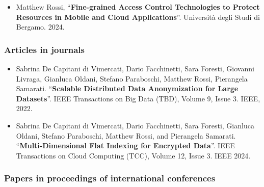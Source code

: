 \begin{itemize}
    \nocite{thesis}
    \item Matthew Rossi, ``\textbf{Fine-grained Access Control
        Technologies to Protect Resources in Mobile and Cloud
        Applications}''. Università degli Studi di Bergamo. 2024.
\end{itemize}

\subsubsection*{Articles in journals}

\begin{itemize}
    \nocite{scalable-mondrian}
    \item Sabrina De Capitani di Vimercati, Dario Facchinetti, Sara
        Foresti, Giovanni Livraga, Gianluca Oldani, Stefano
        Paraboschi, Matthew Rossi, Pierangela Samarati.
        ``\textbf{Scalable Distributed Data Anonymization for Large
        Datasets}''. IEEE Transactions on Big Data (TBD), Volume 9,
        Issue 3. IEEE, 2022.
    
    \nocite{k-flat}
    \item Sabrina De Capitani di Vimercati, Dario Facchinetti, Sara
        Foresti, Gianluca Oldani, Stefano Paraboschi, Matthew Rossi,
        and Pierangela Samarati. ``\textbf{Multi-Dimensional Flat
        Indexing for Encrypted Data}''. IEEE Transactions on Cloud
        Computing (TCC), Volume 12, Issue 3. IEEE 2024.
\end{itemize}

\subsubsection*{Papers in proceedings of international conferences}

